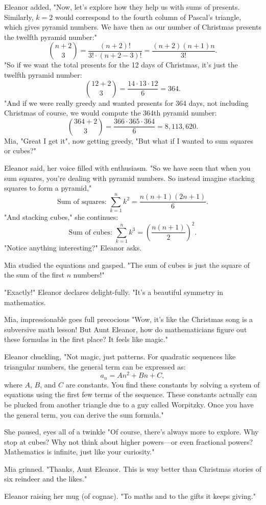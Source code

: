 \noindent
Eleanor added,  "Now, let’s explore how they help us with sums of presents. Similarly, \(k=2\) would correspond to the fourth column of Pascal’s triangle, which gives pyramid numbers. We have then as our number of Christmas presents the twelfth pyramid number:" 
\[
\binom{n+2}{3} = \frac{(n+2)!}{3! \cdot (n+2-3)!}= \frac{(n+2)(n+1)n}{3!} .
\]
"So if we want the total presents for the 12 days of Christmas, it’s just the twelfth pyramid number:
\[
\binom{12+2}{3} = \frac{14 \cdot 13 \cdot 12}{6} = 364.
\]
"And if we were really greedy and wanted presents for 364 days, not including Christmas of course, we would compute the 364th pyramid number:
\[
\binom{364+2}{3} = \frac{366 \cdot 365 \cdot 364}{6} = 8,113,620.
\]
Mia, "Great I get it", now getting greedy, "But what if I wanted to sum squares or cubes?"

Eleanor said, her voice filled with enthusiasm. "So we have seen that when you sum squares, you’re dealing with pyramid numbers. So instead imagine stacking squares to form a pyramid,"
\[
\text{Sum of squares: } \sum_{k=1}^{n} k^2 = \frac{n(n+1)(2n+1)}{6}.
\]
"And stacking cubes," she continues:
\[
\text{Sum of cubes: } \sum_{k=1}^{n} k^3 = \left(\frac{n(n+1)}{2}\right)^2.
\]
"Notice anything interesting?" Eleanor asks.

Mia studied the equations and gasped. "The sum of cubes is just the square of the sum of the first \(n\) numbers!"

"Exactly!" Eleanor declares delight-fully. "It’s a beautiful symmetry in mathematics. 

Mia, impressionable goes full precocious "Wow, it’s like the Christmas song is a subversive math lesson! But Aunt Eleanor, how do mathematicians figure out these formulas in the first place? It feels like magic."

Eleanor chuckling, "Not magic, just patterns. For quadratic sequences like triangular numbers, the general term can be expressed as:
\[
a_n = An^2 + Bn + C,
\]
where \(A\), \(B\), and \(C\) are constants. You find these constants by solving a system of equations using the first few terms of the sequence. These constants actually can be plucked from another triangle due to a guy called Worpitzky. Once you have the general term, you can derive the sum formula."

She paused, eyes all of a twinkle "Of course, there’s always more to explore. Why stop at cubes? Why not think about higher powers—or even fractional powers? Mathematics is infinite, just like your curiosity."

Mia grinned. "Thanks, Aunt Eleanor. This is way better than Christmas stories of six reindeer and the likes."

Eleanor raising her mug (of cognac). "To maths and to the gifts it keeps giving."
